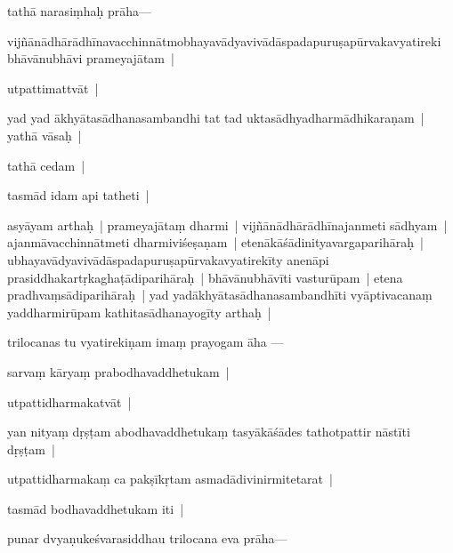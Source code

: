 \documentclass[article,12pt,a4paper]{memoir}
\newcommand{\add}[1]{($^{+}$#1)}
\newcommand{\persName}[1]{#1}
\begin{document}
	  \pstart {}\label{sarit__ratnakīrtinibandhāvali__103807}tathā narasiṃhaḥ prāha—
	\pend
      

	  \pstart vijñānādhārādhīna\edtext{janmājanmā}{\Afootnote{jan\add{mā}janmā \cite{} }}vacchinnātmobhayavādyavivādāspadapuruṣapūrvakavyatireki bhāvānubhāvi prameyajātam |
	\pend
      

	  \pstart utpattimattvāt |
	\pend
      

	  \pstart yad yad ākhyātasādhanasambandhi tat tad uktasādhyadharmādhikaraṇam | yathā vāsaḥ |
	\pend
      

	  \pstart tathā cedam |
	\pend
      

	  \pstart tasmād idam api tatheti |\label{sarit__ratnakīrtinibandhāvali__104267}
	\pend
      

	  \pstart asyāyam arthaḥ | prameyajātaṃ dharmi | vijñānādhārādhīnajanmeti sādhyam | ajanmāvacchinnātmeti dharmiviśeṣaṇam | etenākāśādinityavargaparihāraḥ | ubhayavādyavivādāspadapuruṣapūrvakavya\leavevmode{}\label{RNAms_22b}tirekīty anenāpi prasiddhakartṛkaghaṭādiparihāraḥ | bhāvānubhāvīti vasturūpam | etena pradhvaṃsādiparihāraḥ | yad yadākhyātasādhanasambandhīti vyāptivacanaṃ yaddharmirūpam kathitasādhanayogīty arthaḥ |
	\pend
      

	  \pstart \label{sarit__ratnakīrtinibandhāvali__104795}\persName{trilocanas} tu vyatirekiṇam imaṃ prayogam āha —
	\pend
      

	  \pstart sarvaṃ kāryaṃ prabodhavaddhetukam |
	\pend
      

	  \pstart utpattidharmakatvāt |
	\pend
      

	  \pstart yan nityaṃ dṛṣṭam abodhavaddhetukaṃ tasyākāśādes tathotpattir nāstīti dṛṣṭam |
	\pend
      

	  \pstart utpattidharmakaṃ ca pakṣīkṛtam asmadādivinirmitetarat |
	\pend
      

	  \pstart tasmād bodhavaddhetukam iti |\label{sarit__ratnakīrtinibandhāvali__105213}
	\pend
      

	  \pstart punar dvyaṇukeśvarasiddhau \persName{trilocana} eva prāha—
	\pend
      
\end{document}
